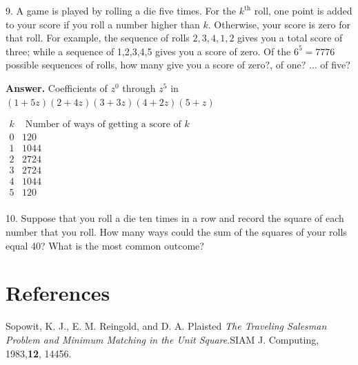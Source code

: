 \documentclass[10pt,]{book}
\theoremstyle{plain}
\theoremstyle{definition}
\theoremstyle{definition}
\theoremstyle{definition}
\theoremstyle{definition}
\numberwithin{equation}{section}
\begin{document}
\begin{exercisegroup}
\item[9.]\hypertarget{exercise-45}{}A game is played by rolling a die five times. For the \(k^{\text{th}}\) roll, one point is added to your score if you roll a number higher
than \(k\). Otherwise, your score is zero for that roll. For example, the sequence of rolls \(2,3,4,1,2\) gives you a total score of three;
while a sequence of 1,2,3,4,5 gives you a score of zero. Of the \(6^5 = 7776\) possible sequences of rolls, how many give you a score of zero?, of
one? \(\ldots \) of five?%
\par\smallskip
\par\smallskip
\noindent\textbf{Answer.}\hypertarget{answer-23}{}\quad
 Coefficients of \(z^0\) through \(z^5\) in \((1+5z)(2+4z)(3+3z)(4+2z)(5+z)\)%
\par

\(\begin{array}{cc}
 k & \textrm{ Number of ways of getting a score of } k \\
 0 & 120 \\
 1 & 1044 \\
 2 & 2724 \\
 3 & 2724 \\
 4 & 1044 \\
 5 & 120 \\
\end{array}\)%
\item[10.]\hypertarget{exercise-46}{} Suppose that you roll a die ten times in a row and record the square of each number that you roll. How many ways could the sum of the squares
of your rolls equal 40? What is the most common outcome?%
\par\smallskip
\end{exercisegroup}
\par\smallskip\noindent
%
\backmatter
%
%
%
\typeout{************************************************}
\typeout{************************************************}
\chapter[References]{References}\label{references-1}
\begin{referencelist}
\hypertarget{biblio-sopowit-1983}{}Sopowit, K. J., E. M. Reingold, and D. A. Plaisted \textit{The Traveling Salesman Problem and Minimum Matching in the Unit Square}.SIAM J. Computing, 1983,\textbf{12}, 144\textendash{}56.
\end{referencelist}
%
\printindex
%
\end{document}
